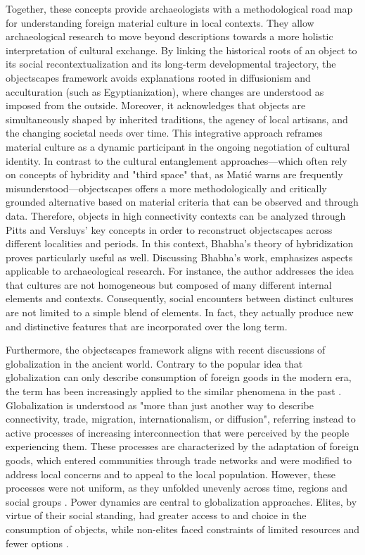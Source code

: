 Together, these concepts provide archaeologists with a methodological road map for understanding foreign material culture in local contexts. They allow archaeological research to move beyond descriptions towards a more holistic interpretation of cultural exchange. By linking the historical roots of an object to its social recontextualization and its long-term developmental trajectory, the objectscapes framework avoids explanations rooted in diffusionism and acculturation (such as Egyptianization), where changes are understood as imposed from the outside. Moreover, it acknowledges that objects are simultaneously shaped by inherited traditions, the agency of local artisans, and the changing societal needs over time. This integrative approach reframes material culture as a dynamic participant in the ongoing negotiation of cultural identity. In contrast to the cultural entanglement approaches---which often rely on concepts of hybridity and "third space" that, as Matić warns are frequently misunderstood---objectscapes offers a more methodologically and critically grounded alternative based on material criteria that can be observed and through data. Therefore, objects in high connectivity contexts can be analyzed through Pitts and Versluys' key concepts in order to reconstruct objectscapes across different localities and periods. In this context, Bhabha's theory of hybridization proves particularly useful as well. Discussing Bhabha's work, \textcite{fahlanderThirdSpaceEncounters2007} emphasizes aspects applicable to archaeological research. For instance, the author addresses the idea that cultures are not homogeneous but composed of many different internal elements and contexts. Consequently, social encounters between distinct cultures are not limited to a simple blend of elements. In fact, they actually produce new and distinctive features that are incorporated over the long term.


Furthermore, the objectscapes framework aligns with recent discussions of globalization in the ancient world. Contrary to the popular idea that globalization can only describe consumption of foreign goods in the modern era, the term has been increasingly applied to the similar phenomena in the past \parencites{pittsGlobalisationCirculationMass2014}. Globalization is understood as "more than just another way to describe connectivity, trade, migration, internationalism, or diffusion", referring instead to active processes of increasing interconnection that were perceived by the people experiencing them. These processes are characterized by the adaptation of foreign goods, which entered communities through trade networks and were modified to address local concerns and to appeal to the local population. However, these processes were not uniform, as they unfolded unevenly across time, regions and social groups \parencites[p.~3-8]{hodosGlobalizationBasicsIntroduction2017}. Power dynamics are central to globalization approaches. Elites, by virtue of their social standing, had greater access to and choice in the consumption of objects, while non-elites faced constraints of limited resources and fewer options \parencites[p.~15]{pittsGlobalisationCirculationMass2014}.


